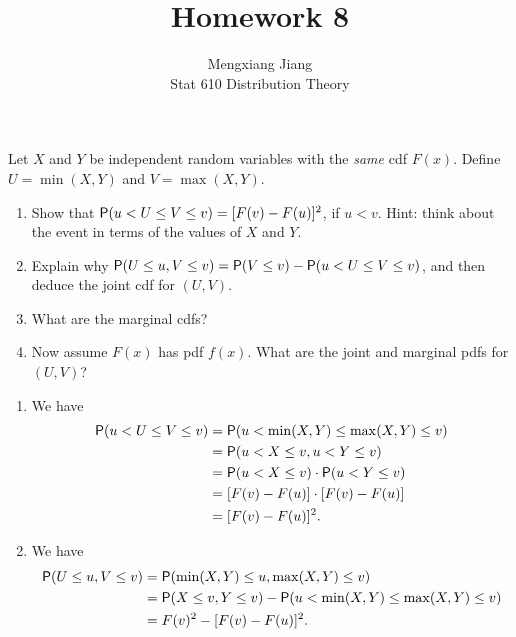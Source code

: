 \documentclass[12pt]{article}
\newcommand{\Prob}{{\sf P}}
\newenvironment{problem}[2][Problem]{\begin{trivlist}
\item[\hskip \labelsep {\bfseries #1}\hskip \labelsep {\bfseries #2.}]}
{\end{trivlist}}
\begin{document}
 
 
\title{Homework 8}%
\author{Mengxiang Jiang\\ %
Stat 610 Distribution Theory} %
 
\maketitle

\begin{problem}{1}
  Let $X$ and $Y$ be independent random variables with the \textit{same}
  cdf $F(x)$. Define $U = \min(X,Y)$ and $V = \max(X,Y)$.
  \begin{enumerate}
    \item Show that $\Prob(u < U \le V \le v) = [F(v) - F(u)]^2$, if
    $u < v$. Hint: think about the event in terms of the values of $X$ and $Y$.
    \item Explain why $\Prob(U \le u, V \le v) = \Prob(V \le v) 
    - \Prob(u < U \le V \le v)$, and then deduce the joint cdf for $(U, V )$.
    \item What are the marginal cdfs?
    \item Now assume $F(x)$ has pdf $f(x)$. What are the joint and marginal 
    pdfs for $(U, V )$?
  \end{enumerate}
  \begin{enumerate}
    \item We have
    \begin{align*}
      \Prob(u < U \le V \le v) &= \Prob(u < \min(X,Y) \le \max(X,Y) \le v) \\
      &= \Prob(u < X \le v, u < Y \le v) \\
      &= \Prob(u < X \le v) \cdot \Prob(u < Y \le v) \\
      &= [F(v) - F(u)] \cdot [F(v) - F(u)] \\
      &= [F(v) - F(u)]^2.
  \end{align*}
    \item We have
    \begin{align*}
      \Prob(U \le u, V \le v) &= \Prob(\min(X,Y) \le u, \max(X,Y) \le v) \\
      &= \Prob(X \le v, Y \le v) - \Prob(u < \min(X,Y) \le \max(X,Y) \le v) \\
      &= F(v)^2 - [F(v) - F(u)]^2.

\end{align*}
\end{enumerate}
\end{problem}
\end{document}
